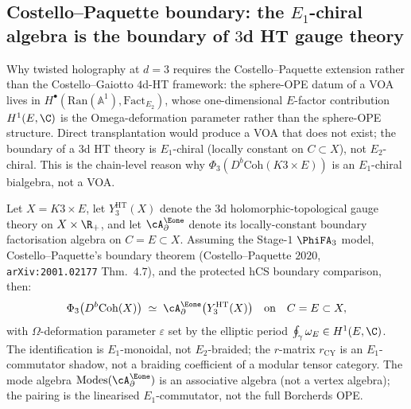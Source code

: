 \subsection{Costello--Paquette boundary: the \texorpdfstring{$E_1$}{E-1}-chiral algebra is the boundary of \texorpdfstring{$3$}{3}d HT gauge theory}
\label{subsec:costello-paquette-E1-chiral-d3}

Why twisted holography at $d = 3$ requires the Costello--Paquette
extension rather than the Costello--Gaiotto $4$d-HT framework: the
sphere-OPE datum of a VOA lives in $H^\bullet(\mathrm{Ran}(\mathbb{A}^1),
\mathrm{Fact}_{E_2})$, whose one-dimensional $E$-factor contribution
$H^1(E, \C)$ is the Omega-deformation parameter rather than the
sphere-OPE structure. Direct transplantation would produce a VOA that
does not exist; the boundary of a $3$d HT theory is $E_1$-chiral
(locally constant on $C \subset X$), not $E_2$-chiral. This is the
chain-level reason why $\Phi_3(D^b\mathrm{Coh}(K3 \times E))$ is an
$E_1$-chiral bialgebra, not a VOA.

\begin{proposition}[Costello--Paquette \texorpdfstring{$E_1$}{E-1}-chiral boundary at \texorpdfstring{$d=3$}{d=3}]
\label{prop:costello-paquette-E1-boundary-holdata}
Let $X = K3 \times E$, let $Y^{\mathrm{HT}}_3(X)$ denote the $3$d
holomorphic-topological gauge theory on $X \times \R_+$, and let
$\cA^{\Eone}_\partial$ denote its locally-constant boundary
factorisation algebra on $C = E \subset X$. Assuming the Stage-$1$
$\PhiFA_3$ model, Costello--Paquette's boundary theorem
\textup{(}Costello--Paquette $2020$, \texttt{arXiv:2001.02177}
Thm.~$4.7$\textup{)}, and the protected hCS boundary comparison, then:
\[
 \Phi_3\bigl(D^b\mathrm{Coh}(X)\bigr)
 \;\simeq\;
 \cA^{\Eone}_\partial\bigl(Y^{\mathrm{HT}}_3(X)\bigr)
 \quad\text{on}\quad
 C = E \subset X,
\]
with $\Omega$-deformation parameter $\varepsilon$ set by the elliptic
period $\oint_\gamma \omega_E \in H^1(E, \C)$. The identification is
$E_1$-monoidal, not $E_2$-braided; the $r$-matrix $r_{\mathrm{CY}}$ is
an $E_1$-commutator shadow, not a braiding coefficient of a modular
tensor category. The mode algebra
$\mathrm{Modes}(\cA^{\Eone}_\partial)$ is an associative algebra (not
a vertex algebra); the pairing is the linearised $E_1$-commutator,
not the full Borcherds OPE.
\end{proposition}

